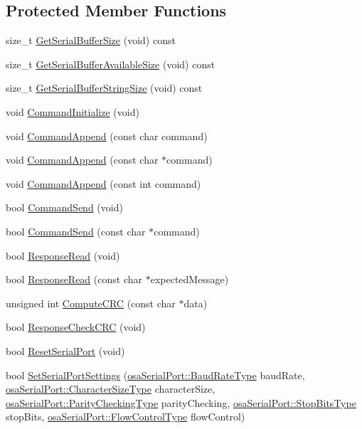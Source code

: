 \subsection*{Protected Member Functions}
\begin{DoxyCompactItemize}
\item 
size\-\_\-t \hyperlink{classmts_n_d_i_serial_ac8a27a2d361d54e18f42bbb781579f89}{Get\-Serial\-Buffer\-Size} (void) const 
\item 
size\-\_\-t \hyperlink{classmts_n_d_i_serial_ab92f85026b083a1fcdf9d922b3ab68f7}{Get\-Serial\-Buffer\-Available\-Size} (void) const 
\item 
size\-\_\-t \hyperlink{classmts_n_d_i_serial_a9f357b1e5da8c03386bb4dc2f1542bd1}{Get\-Serial\-Buffer\-String\-Size} (void) const 
\item 
void \hyperlink{classmts_n_d_i_serial_a8a6ba78f9b80fdb24fd189422da7e4b5}{Command\-Initialize} (void)
\item 
void \hyperlink{classmts_n_d_i_serial_a9366654f3d449d347c6a14b9b8252a9a}{Command\-Append} (const char command)
\item 
void \hyperlink{classmts_n_d_i_serial_a2e12dd893750b4e5e64082f5b8993a05}{Command\-Append} (const char $\ast$command)
\item 
void \hyperlink{classmts_n_d_i_serial_af1cc056933ad733c71f816f5b72085cb}{Command\-Append} (const int command)
\item 
bool \hyperlink{classmts_n_d_i_serial_a2c67f959ae4cf47b2046395d2e8c2104}{Command\-Send} (void)
\item 
bool \hyperlink{classmts_n_d_i_serial_aa69c858f9e2d77de24f60d001aaf8d1b}{Command\-Send} (const char $\ast$command)
\item 
bool \hyperlink{classmts_n_d_i_serial_ae12efe6d7a99785ff11d5957ecf7bc9d}{Response\-Read} (void)
\item 
bool \hyperlink{classmts_n_d_i_serial_a843967c21008da12c0cef308560111dc}{Response\-Read} (const char $\ast$expected\-Message)
\item 
unsigned int \hyperlink{classmts_n_d_i_serial_a0687fdfd5546056b54ccb0d823349810}{Compute\-C\-R\-C} (const char $\ast$data)
\item 
bool \hyperlink{classmts_n_d_i_serial_a69f428347e1556446792be003d9acbc7}{Response\-Check\-C\-R\-C} (void)
\item 
bool \hyperlink{classmts_n_d_i_serial_ae710bd6959672cf21a126b8d1dcaae0d}{Reset\-Serial\-Port} (void)
\item 
bool \hyperlink{classmts_n_d_i_serial_a23de00ad1b5a7008917998252c8b0b05}{Set\-Serial\-Port\-Settings} (\hyperlink{classosa_serial_port_a3fd8e997892088f924754f9cc11c78a4}{osa\-Serial\-Port\-::\-Baud\-Rate\-Type} baud\-Rate, \hyperlink{classosa_serial_port_a9b6b558d8e4327ca921d9c010bec0462}{osa\-Serial\-Port\-::\-Character\-Size\-Type} character\-Size, \hyperlink{classosa_serial_port_a5a7547284e891eed488992c6a7204bfa}{osa\-Serial\-Port\-::\-Parity\-Checking\-Type} parity\-Checking, \hyperlink{classosa_serial_port_aaa561ff95e10634b7ffa9ebf0ff164b5}{osa\-Serial\-Port\-::\-Stop\-Bits\-Type} stop\-Bits, \hyperlink{classosa_serial_port_a006138c4626520d3c2c1e5a78b279435}{osa\-Serial\-Port\-::\-Flow\-Control\-Type} flow\-Control)

\end{DoxyCompactItemize}

